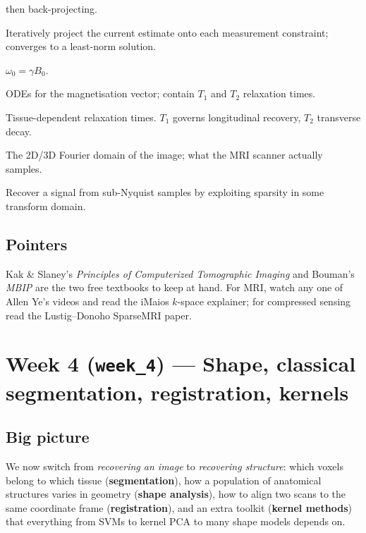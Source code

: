 \documentclass[11pt,a4paper]{article}
\begin{document}
\begin{description}[leftmargin=*]
        then back-projecting.
  \item[\textbf{ART (algebraic reconstruction).}] Iteratively project
        the current estimate onto each measurement constraint;
        converges to a least-norm solution.
  \item[\textbf{Larmor frequency.}] $\omega_0 = \gamma B_0$.
  \item[\textbf{Bloch equations.}] ODEs for the magnetisation vector;
        contain $T_1$ and $T_2$ relaxation times.
  \item[\textbf{$T_1$ / $T_2$.}] Tissue-dependent relaxation times.
        $T_1$ governs longitudinal recovery, $T_2$ transverse decay.
  \item[\textbf{$k$-space.}] The 2D/3D Fourier domain of the image;
        what the MRI scanner actually samples.
  \item[\textbf{Compressed sensing.}] Recover a signal from
        sub-Nyquist samples by exploiting sparsity in some
        transform domain.
\end{description}

\subsection{Pointers}

Kak \& Slaney's \emph{Principles of Computerized Tomographic Imaging}
and Bouman's \emph{MBIP} are the two free textbooks to keep at hand.
For MRI, watch any one of Allen Ye's videos and read the iMaios
$k$-space explainer; for compressed sensing read the Lustig--Donoho
SparseMRI paper.

\section{Week 4 (\texttt{week\_4}) --- Shape, classical segmentation, registration, kernels}

\subsection{Big picture}

We now switch from \emph{recovering an image} to \emph{recovering
structure}: which voxels belong to which tissue
(\textbf{segmentation}), how a population of anatomical structures
varies in geometry (\textbf{shape analysis}), how to align two scans
to the same coordinate frame (\textbf{registration}), and an extra
toolkit (\textbf{kernel methods}) that everything from SVMs to kernel
PCA to many shape models depends on.
\end{document}
